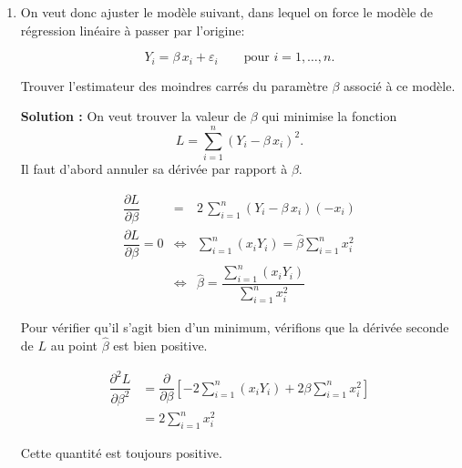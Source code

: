\documentclass[letter, 11pt]{article}
\newcommand{\prof}[1]{\ifdefined\avecsolutions\par{\color{blue}\textbf{Solution :} #1}\par\fi}
\begin{document}
\begin{enumerate}[leftmargin=*, wide, label=\bf Exercice \arabic*:]
{\begin{enumerate}[label={\bf \alph*)}]
\item    L'ordonnée à l'origine indique que dans la population des filles de $18$ ans mesurant $0$ cm, le poids moyen est  de $-234.12$ kg. Ce n'est pas une valeur très intéressante à interpréter ici. \\

 La pente indique quant à elle qu'une hausse de la taille de $1$ cm chez une fille de $18$ ans est associée à une augmentation du poids moyen de 1.75 kg. \\

\item L'estimation de la variance des termes d'erreur est
    $$
     \hat\sigma^2=\frac{\sum_{i=1}^n \hat{\varepsilon}_i^2}{n-2} =  \frac{\sum_{i=1}^n(Y_i-\hat{Y}_i)^2}{n-2}
    $$
     qui vaut ici 41.33.
     
    \end{enumerate}}

\item On veut donc ajuster le modèle suivant, dans lequel on force le modèle de régression linéaire à passer par l'origine:
    
    $$Y_i = \beta\,x_i + \varepsilon_i\qquad\text{pour } i=1,\dots,n.$$
    
    Trouver l'estimateur des moindres carrés du paramètre $\beta$ associé à ce modèle.
    
\prof{On veut trouver la valeur de $\beta$ qui minimise la fonction $$L=\sum\limits_{i=1}^n (Y_i-\beta\,x_i)^2.$$ Il faut d'abord annuler sa dérivée par rapport à $\beta$.


$$\begin{array}{rcl}
\dfrac{\partial L}{\partial\beta}&=& 2\,\sum\limits_{i=1}^n (Y_i-\beta\,x_i)(-x_i)\\[6mm]
\dfrac{\partial L}{\partial\beta}=0&\Leftrightarrow &\sum\limits_{i=1}^n (x_iY_i)= \hat\beta \sum\limits_{i=1}^n  x_i^2\\[6mm]
&\Leftrightarrow &\hat\beta = \dfrac{\sum\limits_{i=1}^n (x_iY_i)}{\sum\limits_{i=1}^n  x_i^2}
\end{array}$$

Pour vérifier qu'il s'agit bien d'un minimum, vérifions que la dérivée seconde de $L$ au point $\hat\beta$ est bien positive.

$$\begin{array}{rl}
\dfrac{\partial^2 L}{\partial\beta^2}&= \dfrac{\partial }{\partial\beta}\left[-2\sum\limits_{i=1}^n (x_iY_i) + 2\beta \sum\limits_{i=1}^n x_i^2\right]\\[6mm]
&= 2\sum\limits_{i=1}^n  x_i^2
\end{array}$$

Cette quantité est toujours positive.}

\end{enumerate}
\end{document}

